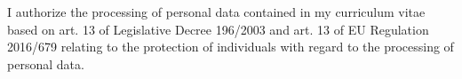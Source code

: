
\setleftcolumnlength{3cm}



\makecvheader
\makecvfooter
{}
{\footnotesize{I authorize the processing of personal data contained in my curriculum vitae based on art. 13 of Legislative Decree 196/2003 and art. 13 of EU Regulation 2016/679 relating to the protection of individuals with regard to the processing of personal data.}}
{}









